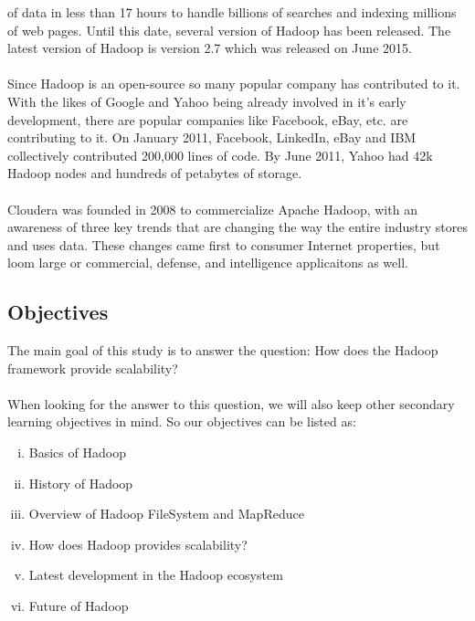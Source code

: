 \documentclass[a4paper,12pt,oneside]{report}
\begin{document}
of data in less than 17 hours to handle billions of searches and indexing millions of web pages.
Until this date, several version of Hadoop has been released. The latest version of Hadoop is version 2.7 which was released on June 2015.\\
\\
Since Hadoop is an open-source so many popular company has contributed to it. With the likes of Google and Yahoo being already involved in it's early
development, there are popular companies like Facebook, eBay, etc. are contributing to it. On January 2011, Facebook, LinkedIn, eBay and IBM collectively contributed 200,000 lines of code. By June 2011, Yahoo had 
42k Hadoop nodes and hundreds of petabytes of storage.\cite{Wikiapache}\\
\\
Cloudera was founded in 2008 to commercialize Apache Hadoop, with an awareness of three key trends that are changing the way the entire industry stores and uses data. These changes came first to consumer Internet properties, but loom large or commercial, defense, and
intelligence applicaitons as well.

\subsection{Objectives}
The main goal of this study is to answer the question: How does the Hadoop framework
provide scalability?\\
\\
When looking for the answer to this question, we will also keep other secondary learning
objectives in mind. So our objectives can be listed as:
\begin{enumerate}[(i)]
        \item Basics of Hadoop
        \item History of Hadoop
        \item Overview of Hadoop FileSystem and MapReduce
        \item How does Hadoop provides scalability?
        \item Latest development in the Hadoop ecosystem
        \item Future of Hadoop
\end{enumerate}
\end{document}
